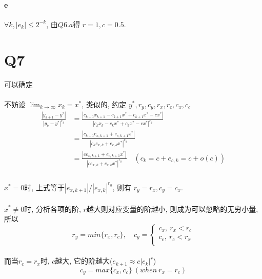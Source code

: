 \documentclass{article}
\begin{document}
\begin{CJK}{UTF8}{gbsn}
  \paragraph{e}
    $\forall k, |e_k| \leq 2^{-k}$, 由$Q6.a$得 $r = 1, c = 0.5$.

\section{Q7}
  可以确定
  \paragraph{}
  不妨设 $\lim_{k \to \infty} x_k = x^*$, 类似的, 约定 $y^*, r_y, c_y, r_x, r_c, c_x, c_c$
  \begin{equation}
    \begin{aligned}
      \frac{|y_{k + 1} - y^*|}{|y_k - y^*|^{r_y}} & = \frac{|c_{k + 1}x_{k + 1} - c_{k + 1}x^* + c_{k + 1}x^* - cx^*|}{|c_{k}x_{k} - c_{k}x^* + c_{k}x^* - cx^*|^{r_y}} \\
      & = \frac{|c_{k + 1}e_{x, k + 1} + e_{c, k + 1}x^*|}{|c_{k}e_{x, k} + e_{c, k}x^*|^{r_y}} \\
      & = \frac{|ce_{x, k + 1} + e_{c, k + 1}x^*|}{|ce_{x, k} + e_{c, k}x^*|^{r_y}} \quad (c_k = c + e_{c, k} = c + o(c)) \\
    \end{aligned}
  \end{equation}
  \paragraph{}
    $x^* = 0$时, 上式等于$|e_{x, k + 1}| / |e_{x, k}|^{r_y}$, 则有 $r_y = r_x, c_y = c_x$.
  \paragraph{}
    $x^* \not= 0$时, 分析各项的阶, $r$越大则对应变量的阶越小, 则成为可以忽略的无穷小量, 所以
    \begin{equation}
      r_y = min\{r_x, r_c\},\quad c_y =
      \begin{cases}
        c_x,\ r_x < r_c \\
        c_c,\ r_c < r_x \\
      \end{cases}
    \end{equation}
  \paragraph{}
  而当$r_c = r_x$时, $c$越大, 它的阶越大($e_{k + 1} \approx c|e_{k}|^r$)
  \begin{equation}
    c_y = max\{c_x, c_c\}\ (when\ r_x = r_c)
  \end{equation}

\end{CJK}
\end{document}

